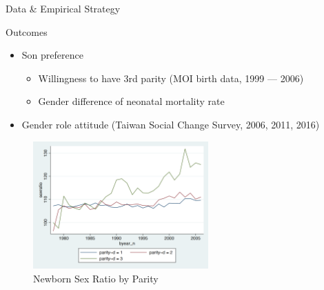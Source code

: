 \documentclass[
  10pt,
  ignorenonframetext,
  aspectratio=43,
]{beamer}
\providecommand{\tightlist}{%
  \setlength{\itemsep}{0pt}\setlength{\parskip}{0pt}}
\begin{document}
\begin{frame}{Data \& Empirical Strategy}
\protect\hypertarget{data-empirical-strategy}{}
\begin{block}{Outcomes}
\protect\hypertarget{outcomes}{}
\begin{itemize}
\tightlist
\item
  Son preference

  \begin{itemize}
  \tightlist
  \item
    Willingness to have 3rd parity (MOI birth data, 1999 --- 2006)
  \item
    Gender difference of neonatal mortality rate
  \end{itemize}
\item
  Gender role attitude (Taiwan Social Change Survey, 2006, 2011, 2016)
\end{itemize}

\begin{figure}
\centering
\includegraphics[width=0.6\textwidth,height=\textheight]{20220425-applied-micro-women-reserved-seats-proposal.assets/sexratioByParity.png}
\caption{Newborn Sex Ratio by Parity}
\end{figure}
\end{block}
\end{frame}
\end{document}
